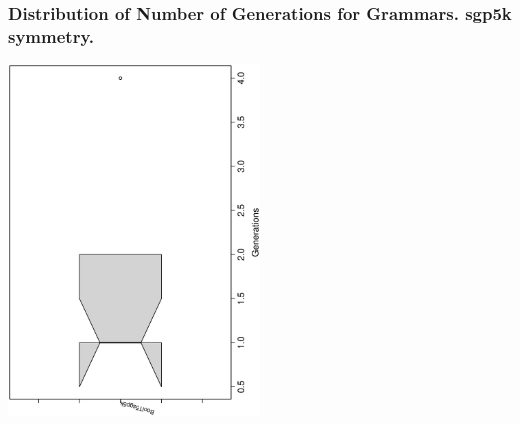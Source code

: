 \begin{frame}
 \frametitle{ Distribution of Number of Generations for Grammars. sgp5k  symmetry. }
 \begin{center}
\includegraphics[width=0.5\textwidth, angle=-90]
{ExpFboxplottGenerations003.eps}
 \end{center}
 \label{ExpFboxplottGenerations003.eps}  
 \end{frame}


